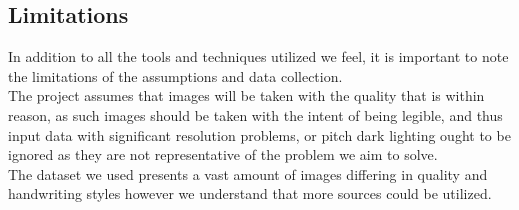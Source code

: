 \documentclass[twoside,a4paper]{article}
\begin{document}
\subsection{Limitations}
In addition to all the tools and techniques utilized we feel, it is important to note the limitations of the assumptions and data collection.\\
The project assumes that images will be taken with the quality that is within reason, as such images should be taken with the intent of being legible, and thus input data with significant resolution problems, or pitch dark lighting ought to be ignored as they are not representative of the problem we aim to solve.\\
The dataset we used presents a vast amount of images differing in quality and handwriting styles however we understand that more sources could be utilized.\\
\printbibliography
\end{document}
